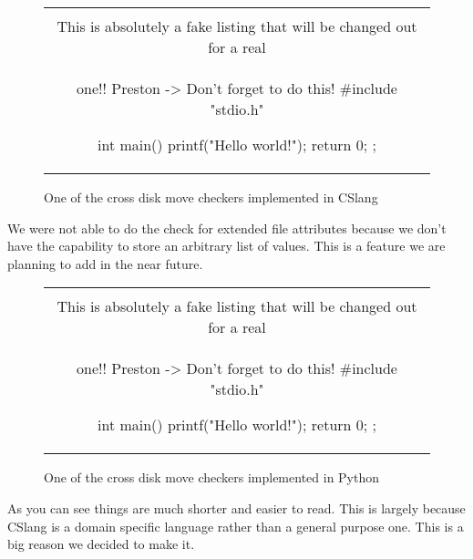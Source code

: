 \begin{figure}[H]
\centering
\begin{tabular}{c}
\begin{lstlisting}
\\ This is absolutely a fake listing that will be changed out for a real
\\ one!!  Preston -> Don't forget to do this!
#include "stdio.h"

int main() {
    printf("Hello world!\n");
    return 0;
};
\end{lstlisting}
\end{tabular}
\caption{One of the cross disk move checkers implemented in CSlang}
\label{lst:Cross-Disk Move}
\end{figure}

We were not able to do the check for extended file attributes because we
don't have the capability to store an arbitrary list of values.  This is a
feature we are planning to add in the near future.

\begin{figure}[H]
\centering
\begin{tabular}{c}
\begin{lstlisting}
\\ This is absolutely a fake listing that will be changed out for a real
\\ one!!  Preston -> Don't forget to do this!
#include "stdio.h"

int main() {
    printf("Hello world!\n");
    return 0;
};
\end{lstlisting}
\end{tabular}
\caption{One of the cross disk move checkers implemented in Python}
\label{lst:Cross-Disk Move}
\end{figure}

As you can see things are much shorter and easier to read.  This is largely
because CSlang is a domain specific language rather than a general purpose
one.  This is a big reason we decided to make it.
